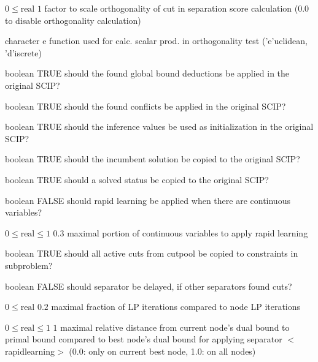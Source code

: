 %
{$0\leq\textrm{real}$}%
{$1$}%
{factor to scale orthogonality of cut in separation score calculation (0.0 to disable orthogonality calculation)}%
{}

%
{character}%
{e}%
{function used for calc. scalar prod. in orthogonality test ('e'uclidean, 'd'iscrete)}%
{}

%
{boolean}%
{TRUE}%
{should the found global bound deductions be applied in the original SCIP?}%
{}

%
{boolean}%
{TRUE}%
{should the found conflicts be applied in the original SCIP?}%
{}

%
{boolean}%
{TRUE}%
{should the inference values be used as initialization in the original SCIP?}%
{}

%
{boolean}%
{TRUE}%
{should the incumbent solution be copied to the original SCIP?}%
{}

%
{boolean}%
{TRUE}%
{should a solved status be copied to the original SCIP?}%
{}

%
{boolean}%
{FALSE}%
{should rapid learning be applied when there are continuous variables?}%
{}

%
{$0\leq\textrm{real}\leq1$}%
{$0.3$}%
{maximal portion of continuous variables to apply rapid learning}%
{}

%
{boolean}%
{TRUE}%
{should all active cuts from cutpool be copied to constraints in subproblem?}%
{}

%
{boolean}%
{FALSE}%
{should separator be delayed, if other separators found cuts?}%
{}

%
{$0\leq\textrm{real}$}%
{$0.2$}%
{maximal fraction of LP iterations compared to node LP iterations}%
{}

%
{$0\leq\textrm{real}\leq1$}%
{$1$}%
{maximal relative distance from current node's dual bound to primal bound compared to best node's dual bound for applying separator $<$rapidlearning$>$ (0.0: only on current best node, 1.0: on all nodes)}%
{}

